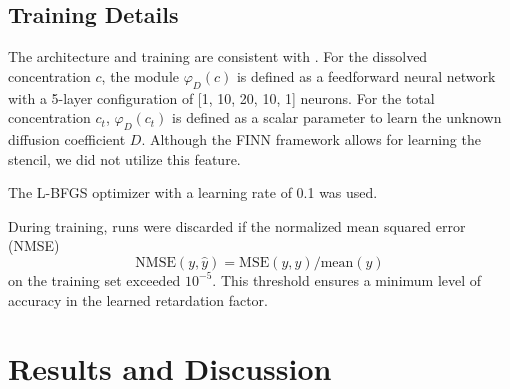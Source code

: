 \section{Training Details}
The architecture and training are consistent with \textcite{finn}. For the dissolved concentration $c$, the module $\varphi_D(c)$ is defined as a feedforward neural network with a 5-layer configuration of [1, 10, 20, 10, 1] neurons. For the total concentration $c_t$, $\varphi_D(c_t)$ is defined as a scalar parameter to learn the unknown diffusion coefficient $D$. Although the FINN framework allows for learning the stencil, we did not utilize this feature.

The L-BFGS optimizer \cite{malouf2002comparison} with a learning rate of 0.1 was used.

During training, runs were discarded if the normalized mean squared error (NMSE)
\begin{equation*}
    \text{NMSE}(y, \hat{y}) = \text{MSE}(y, \hat{y}) / \text{mean}(y)
\end{equation*}
on the training set exceeded $10^{-5}$. This threshold ensures a minimum level of accuracy in the learned retardation factor.



\chapter{Results and Discussion}
\label{sec:results_and_discussion}

